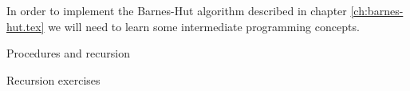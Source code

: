 
In order to implement the Barnes-Hut algorithm described in chapter
\ref{ch:barnes-hut.tex} we will need to learn some intermediate programming
concepts.

 {Procedures and recursion}


 {Recursion exercises}
\label{sec:recursion-exercises}

